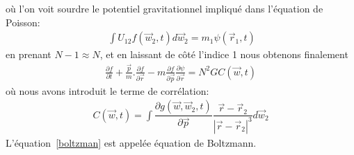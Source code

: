 où l'on voit sourdre le potentiel gravitationnel impliqué dans l'équation de Poisson:
\begin{align*}
	\displaystyle{\ \int U_{12}f\left(  \vec{w}_{2},t\right)  d\vec{w}_{2}=m_{1}\psi\left(  \vec{r}_{1},t\right)  }%
\end{align*}
en prenant $N-1\approx N$, et en laissant de côté l'indice 1 nous obtenons finalement
\begin{align}
	\frac{\partial f}{\partial t}+\frac{\vec{p}}{m}.\frac{\partial f}{\partial\vec{r}}-m\frac{\partial f}{\partial\vec{p}}\frac{\partial\psi
	}{\partial\vec{r}}=N^{2}GC\left(  \vec{w},t\right)  \label{boltzman}%
\end{align}
où nous avons introduit le terme de corrélation:
\begin{align*}
	C\left(  \vec{w},t\right)  =\displaystyle\int\dfrac{\partial g\left(\vec{w},\vec{w}_{2},t\right)  }{\partial\vec{p}}\dfrac{\vec{r}%
	-\vec{r}_{2}}{\left\vert \vec{r}-\vec{r}_{2}\right\vert ^{3}}d\vec{w}_{2}%
\end{align*}
L'équation~\ref{boltzman} est appelée équation de Boltzmann.

